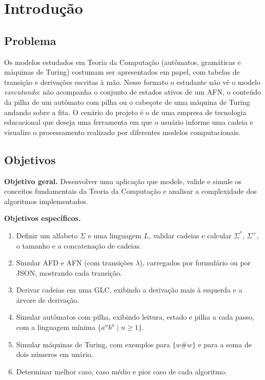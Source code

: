 \documentclass[12pt,a4paper]{article}
\newcommand{\lam}{\lambda}
\begin{document}
\tableofcontents
\newpage

\section{Introdução}

\subsection{Problema}

Os modelos estudados em Teoria da Computação (autômatos, gramáticas e
máquinas de Turing) costumam ser apresentados em papel, com tabelas de
transição e derivações escritas à mão. Nesse formato o estudante não vê o
modelo \emph{executando}: não acompanha o conjunto de estados ativos de um
AFN, o conteúdo da pilha de um autômato com pilha ou o cabeçote de uma
máquina de Turing andando sobre a fita. O cenário do projeto é o de uma
empresa de tecnologia educacional que deseja uma ferramenta em que o
usuário informe uma cadeia e visualize o processamento realizado por
diferentes modelos computacionais.

\subsection{Objetivos}

\textbf{Objetivo geral.} Desenvolver uma aplicação que modele, valide e
simule os conceitos fundamentais da Teoria da Computação e analisar a
complexidade dos algoritmos implementados.

\noindent\textbf{Objetivos específicos.}
\begin{enumerate}
  \item Definir um alfabeto $\Sigma$ e uma linguagem $L$, validar cadeias e
        calcular $\Sigma^*$, $\Sigma^+$, o tamanho e a concatenação de cadeias.
  \item Simular AFD e AFN (com transições $\lam$), carregados por formulário
        ou por JSON, mostrando cada transição.
  \item Derivar cadeias em uma GLC, exibindo a derivação mais à esquerda e a
        árvore de derivação.
  \item Simular autômatos com pilha, exibindo leitura, estado e pilha a cada
        passo, com a linguagem mínima $\{a^nb^n \mid n \ge 1\}$.
  \item Simular máquinas de Turing, com exemplos para $\{w\#w\}$ e para a soma
        de dois números em unário.
  \item Determinar melhor caso, caso médio e pior caso de cada algoritmo.
\end{enumerate}
\end{document}

